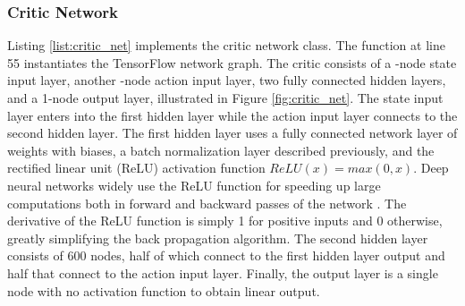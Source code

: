 \subsubsection{Critic Network}
Listing \ref{list:critic_net} implements the critic network class. The function  at line 55 instantiates the TensorFlow network graph. The critic consists of a -node state input layer, another -node action input layer, two fully connected hidden layers, and a 1-node output layer, illustrated in Figure \ref{fig:critic_net}. The state input layer enters into the first hidden layer while the action input layer connects to the second hidden layer. The first hidden layer uses a fully connected network layer of weights with biases, a batch normalization layer described previously, and the rectified linear unit (ReLU) activation function $ReLU(x) = max(0,x)$. Deep neural networks widely use the ReLU function for speeding up large computations both in forward and backward passes of the network \cite{2017arXiv171005941R}. The derivative of the ReLU function is simply 1 for positive inputs and 0 otherwise, greatly simplifying the back propagation algorithm. The second hidden layer consists of 600 nodes, half of which connect to the first hidden layer output and half that connect to the action input layer. Finally, the output layer is a single node with no activation function to obtain linear output.

